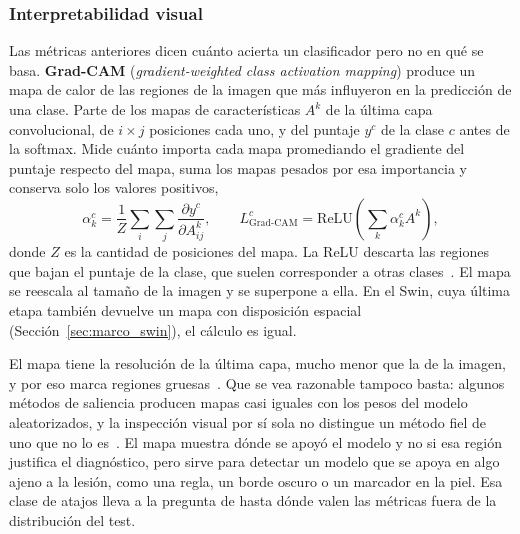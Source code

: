 \subsubsection{Interpretabilidad visual}
\label{sec:marco_eval_gradcam}
\setcounter{secnumdepth}{2}

Las métricas anteriores dicen cuánto acierta un clasificador pero no en qué se basa. \textbf{Grad-CAM}
(\emph{gradient-weighted class activation mapping}) produce un mapa de calor de las regiones de la imagen que
más influyeron en la predicción de una clase. Parte de los mapas de características $A^k$ de la última capa
convolucional, de $i \times j$ posiciones cada uno, y del puntaje $y^c$ de la clase $c$ antes de la softmax.
Mide cuánto importa cada mapa promediando el gradiente del puntaje respecto del mapa, suma los mapas pesados
por esa importancia y conserva solo los valores positivos,
\begin{equation}
    \alpha_k^c = \frac{1}{Z}\sum_{i}\sum_{j} \frac{\partial y^c}{\partial A^k_{ij}}, \qquad
    L^c_{\text{Grad-CAM}} = \mathrm{ReLU}\!\left(\sum_k \alpha_k^c A^k\right),
    \label{eq:marco_gradcam}
\end{equation}
donde $Z$ es la cantidad de posiciones del mapa. La ReLU descarta las regiones que bajan el puntaje de la
clase, que suelen corresponder a otras clases~\cite{selvaraju2017gradcam}. El mapa se reescala al tamaño de
la imagen y se superpone a ella. En el Swin, cuya última etapa también devuelve un mapa con disposición
espacial (Sección~\ref{sec:marco_swin}), el cálculo es igual.

El mapa tiene la resolución de la última capa, mucho menor que la de la imagen, y por eso marca regiones
gruesas~\cite{selvaraju2017gradcam}. Que se vea razonable tampoco basta: algunos métodos de saliencia
producen mapas casi iguales con los pesos del modelo aleatorizados, y la inspección visual por sí sola no
distingue un método fiel de uno que no lo es~\cite{adebayo2018sanity}. El mapa muestra dónde se apoyó el
modelo y no si esa región justifica el diagnóstico, pero sirve para detectar un modelo que se apoya en algo
ajeno a la lesión, como una regla, un borde oscuro o un marcador en la piel. Esa clase de atajos lleva a la
pregunta de hasta dónde valen las métricas fuera de la distribución del test.
